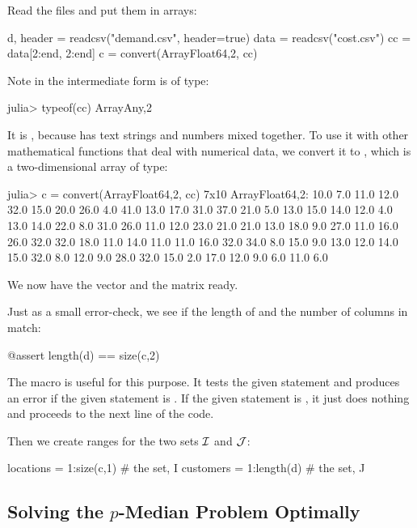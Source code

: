 Read the  files and put them in arrays:
\begin{code}
d, header = readcsv("demand.csv",  header=true)
data = readcsv("cost.csv")
cc = data[2:end, 2:end]
c = convert(Array{Float64,2}, cc)
\end{code}
\noindent Note in the intermediate form  is of  type:
\begin{code}
julia> typeof(cc)
Array{Any,2}
\end{code}
\noindent It is , because  has text strings and numbers mixed together. To use it with other mathematical functions that deal with numerical data, we convert it to , which is a two-dimensional array of  type:
\begin{code}
julia> c = convert(Array{Float64,2}, cc)
7x10 Array{Float64,2}:
 10.0   7.0  11.0  12.0  32.0  15.0  20.0  26.0   4.0  41.0
 13.0  17.0  31.0  37.0  21.0   5.0  13.0  15.0  14.0  12.0
  4.0  13.0  14.0  22.0   8.0  31.0  26.0  11.0  12.0  23.0
 21.0  21.0  13.0  18.0   9.0  27.0  11.0  16.0  26.0  32.0
 32.0  18.0  11.0  14.0  11.0  11.0  16.0  32.0  34.0   8.0
 15.0   9.0  13.0  12.0  14.0  15.0  32.0   8.0  12.0   9.0
 28.0  32.0  15.0   2.0  17.0  12.0   9.0   6.0  11.0   6.0
\end{code}
\noindent We now have the  vector and the  matrix ready.

Just as a small error-check, we see if the length of  and the number of columns in  match:
\begin{code}
@assert length(d) == size(c,2)
\end{code}
\noindent The  macro is useful for this purpose. It tests the given statement and produces an error if the given statement is . If the given statement is , it just does nothing and proceeds to the next line of the code.

Then we create ranges for the two sets $\mathcal{I}$ and $\mathcal{J}$:
\begin{code}
locations = 1:size(c,1) # the set, I
customers = 1:length(d) # the set, J
\end{code}



\subsection{Solving the $p$-Median Problem Optimally}

